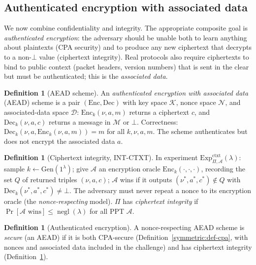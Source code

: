 \documentclass[11pt,a4paper]{article}
\theoremstyle{definition}
\newtheorem{definition}[theorem]{Definition}
\theoremstyle{remark}
\DeclareMathOperator{\negl}{negl}
\begin{document}
\subsection{Authenticated encryption with associated data}

We now combine confidentiality and integrity. The appropriate composite goal is \emph{authenticated encryption}: the adversary should be unable both to learn anything about plaintexts (CPA security) and to produce any new ciphertext that decrypts to a non-\(\bot\) value (ciphertext integrity). Real protocols also require ciphertexts to bind to public context (packet headers, version numbers) that is sent in the clear but must be authenticated; this is the \emph{associated data}.

\begin{definition}[AEAD scheme]\label{symmetric:def-aead}
An \emph{authenticated encryption with associated data} (AEAD) scheme is a pair \((\mathrm{Enc}, \mathrm{Dec})\) with key space \(\mathcal{K}\), nonce space \(\mathcal{N}\), and associated-data space \(\mathcal{D}\):
\(\mathrm{Enc}_k(\nu, a, m)\) returns a ciphertext \(c\), and \(\mathrm{Dec}_k(\nu, a, c)\) returns a message in \(\mathcal{M}\) or \(\bot\). Correctness: \(\mathrm{Dec}_k(\nu, a, \mathrm{Enc}_k(\nu, a, m)) = m\) for all \(k,\nu,a,m\). The scheme authenticates but does not encrypt the associated data \(a\).
\end{definition}

\begin{definition}[Ciphertext integrity, INT-CTXT]\label{symmetric:def-intctxt}
In experiment \(\mathrm{Exp}^{\mathrm{ctxt}}_{\Pi,\mathcal{A}}(\lambda)\): sample \(k \leftarrow \mathrm{Gen}(1^\lambda)\); give \(\mathcal{A}\) an encryption oracle \(\mathrm{Enc}_k(\cdot,\cdot,\cdot)\), recording the set \(Q\) of returned triples \((\nu, a, c)\); \(\mathcal{A}\) wins if it outputs \((\nu^\ast, a^\ast, c^\ast) \notin Q\) with \(\mathrm{Dec}_k(\nu^\ast, a^\ast, c^\ast) \ne \bot\). The adversary must never repeat a nonce to its encryption oracle (the \emph{nonce-respecting} model). \(\Pi\) has \emph{ciphertext integrity} if \(\Pr[\mathcal{A}\text{ wins}] \le \negl(\lambda)\) for all PPT \(\mathcal{A}\).
\end{definition}

\begin{definition}[Authenticated encryption]\label{symmetric:def-ae}
A nonce-respecting AEAD scheme is \emph{secure} (an AEAD) if it is both CPA-secure (Definition~\ref{symmetric:def-cpa}, with nonces and associated data included in the challenge) and has ciphertext integrity (Definition~\ref{symmetric:def-intctxt}).
\end{definition}
\end{document}
